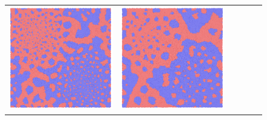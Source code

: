 \documentclass[12pt, reqno]{report}
\theoremstyle{definition}
\theoremstyle{remark}
\begin{document}
\begin{figure}[H]
\begin{tabular}{rccccc}
        \includegraphics[align = c, height=\subheight]{media_paper/phase200.png} & 
        \includegraphics[align = c, height=\subheight]{media_paper/phase500.png} & 

\end{tabular}
\end{figure}
\end{document}

